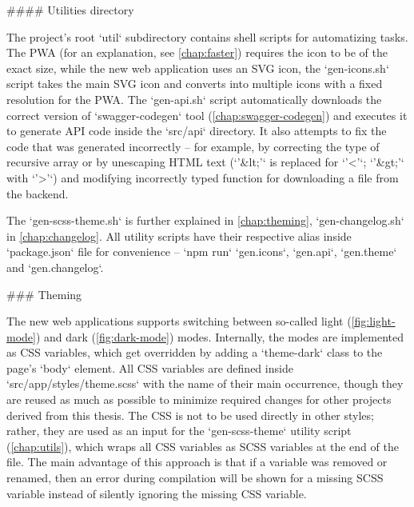\documentclass[
  digital, %
  oneside, %
  lof,     %
  nolot,     %
]{fithesis4}
\begin{document}
{#### Utilities directory
\label{chap:utils}

The project's root `util` subdirectory contains shell scripts for automatizing tasks. The \acrshort{PWA} (for an explanation, see \autoref{chap:faster}) requires the icon to be of the exact size, while the new web application uses an \acrshort{SVG} icon, the `gen-icons.sh` script takes the main \acrshort{SVG} icon and converts into multiple icons with a fixed resolution for the \acrshort{PWA}. The `gen-api.sh` script automatically downloads the correct version of `swagger-codegen` tool (\autoref{chap:swagger-codegen}) and executes it to generate \acrshort{API} code inside the `src/api` directory. It also attempts to fix the code that was generated incorrectly -- for example, by correcting the type of recursive array or by unescaping \acrshort{HTML} text (`'&lt;'` is replaced for `'<'`; `'&gt;'` with `'>'`) and modifying incorrectly typed function for downloading a file from the backend.

The `gen-scss-theme.sh` is further explained in \autoref{chap:theming}, `gen-changelog.sh` in \autoref{chap:changelog}. All utility scripts have their respective alias inside `package.json` file for convenience -- `npm run` `gen.icons`, `gen.api`, `gen.theme` and `gen.changelog`. 

### Theming
\label{chap:theming}

The new web applications supports switching between so-called light (\autoref{fig:light-mode}) and dark (\autoref{fig:dark-mode}) modes. Internally, the modes are implemented as \acrshort{CSS} variables, which get overridden by adding a `theme-dark` class to the page's `body` element. All \acrshort{CSS} variables are defined inside `src/app/styles/theme.scss` with the name of their main occurrence, though they are reused as much as possible to minimize required changes for other projects derived from this thesis. The \acrshort{CSS} is not to be used directly in other styles; rather, they are used as an input for the `gen-scss-theme` utility script (\autoref{chap:utils}), which wraps all \acrshort{CSS} variables as SCSS variables at the end of the file. The main advantage of this approach is that if a variable was removed or renamed, then an error during compilation will be shown for a missing SCSS variable instead of silently ignoring the missing \acrshort{CSS} variable.

}
\end{document}
